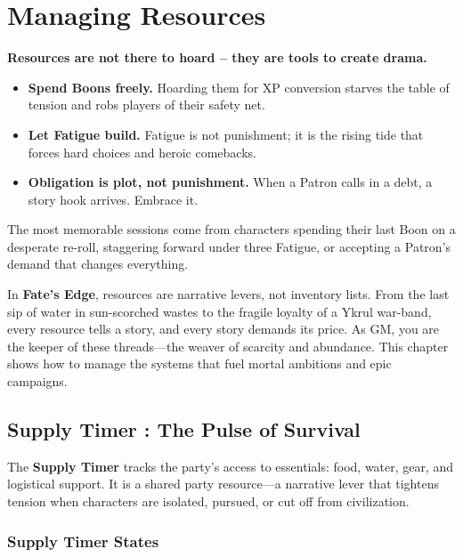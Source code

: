\chapter{Managing Resources}
\label{ch:gm-resources}

\begin{tcolorbox}[colback=blue!5!white, colframe=blue!75!black, title={Philosophy of Resources},breakable]
\textbf{Resources are not there to hoard -- they are tools to create drama.}

\begin{itemize}
  \item \textbf{Spend Boons freely.} Hoarding them for XP conversion starves the table of tension and robs players of their safety net.
  \item \textbf{Let Fatigue build.} Fatigue is not punishment; it is the rising tide that forces hard choices and heroic comebacks.
  \item \textbf{Obligation is plot, not punishment.} When a Patron calls in a debt, a story hook arrives. Embrace it.
\end{itemize}

The most memorable sessions come from characters spending their last Boon on a desperate re-roll, staggering forward under three Fatigue, or accepting a Patron's demand that changes everything.
\end{tcolorbox}

In \textbf{Fate's Edge}, resources are narrative levers, not inventory lists. From the last sip of water in sun-scorched wastes to the fragile loyalty of a Ykrul war-band, every resource tells a story, and every story demands its price. As GM, you are the keeper of these threads---the weaver of scarcity and abundance. This chapter shows how to manage the systems that fuel mortal ambitions and epic campaigns.

\section{Supply Timer : The Pulse of Survival}
\label{sec:supply-timer}

The \textbf{Supply Timer } tracks the party's access to essentials: food, water, gear, and logistical support. It is a shared party resource---a narrative lever that tightens tension when characters are isolated, pursued, or cut off from civilization.

\subsection{Supply Timer States}
\label{subsec:supply-stats}

